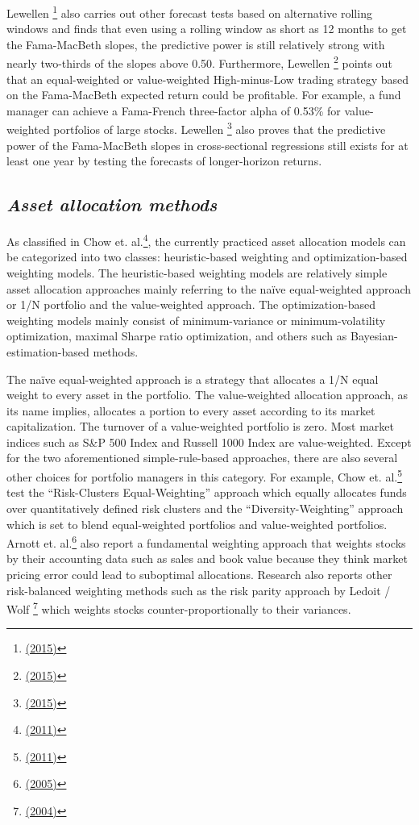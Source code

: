 \documentclass[a4paper,12pt]{article}
\begin{document}
Lewellen \footnote{\protect\hyperlink{ref-RN46}{(2015)}} also carries out other forecast tests based on alternative rolling windows and finds that even using a rolling window as short as 12 months to get the Fama-MacBeth slopes, the predictive power is still relatively strong with nearly two-thirds of the slopes above 0.50. Furthermore, Lewellen \footnote{\protect\hyperlink{ref-RN46}{(2015)}} points out that an equal-weighted or value-weighted High-minus-Low trading strategy based on the Fama-MacBeth expected return could be profitable. For example, a fund manager can achieve a Fama-French three-factor alpha of 0.53\% for value-weighted portfolios of large stocks. Lewellen \footnote{\protect\hyperlink{ref-RN46}{(2015)}} also proves that the predictive power of the Fama-MacBeth slopes in cross-sectional regressions still exists for at least one year by testing the forecasts of longer-horizon returns.

\hypertarget{asset-allocation-methods}{%
\subsection{\texorpdfstring{\emph{Asset allocation methods}}{Asset allocation methods}}\label{asset-allocation-methods}}

As classified in Chow et. al.\footnote{\protect\hyperlink{ref-RN88}{(2011)}}, the currently practiced asset allocation models can be categorized into two classes: heuristic-based weighting and optimization-based weighting models. The heuristic-based weighting models are relatively simple asset allocation approaches mainly referring to the naïve equal-weighted approach or 1/N portfolio and the value-weighted approach. The optimization-based weighting models mainly consist of minimum-variance or minimum-volatility optimization, maximal Sharpe ratio optimization, and others such as Bayesian-estimation-based methods.

The naïve equal-weighted approach is a strategy that allocates a 1/N equal weight to every asset in the portfolio. The value-weighted allocation approach, as its name implies, allocates a portion to every asset according to its market capitalization. The turnover of a value-weighted portfolio is zero. Most market indices such as S\&P 500 Index and Russell 1000 Index are value-weighted. Except for the two aforementioned simple-rule-based approaches, there are also several other choices for portfolio managers in this category. For example, Chow et. al.\footnote{\protect\hyperlink{ref-RN88}{(2011)}} test the ``Risk-Clusters Equal-Weighting'' approach which equally allocates funds over quantitatively defined risk clusters and the ``Diversity-Weighting'' approach which is set to blend equal-weighted portfolios and value-weighted portfolios. Arnott et. al.\footnote{\protect\hyperlink{ref-RN89}{(2005)}} also report a fundamental weighting approach that weights stocks by their accounting data such as sales and book value because they think market pricing error could lead to suboptimal allocations. Research also reports other risk-balanced weighting methods such as the risk parity approach by Ledoit / Wolf \footnote{\protect\hyperlink{ref-RN91}{(2004)}} which weights stocks counter-proportionally to their variances.
\end{document}
